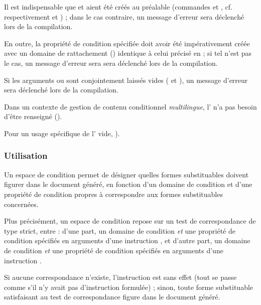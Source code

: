 \documentclass{article}
\begin{document}
Il est indispensable que  et  aient été créés au préalable (commandes  et , cf. respectivement  et ) ; dans le cas contraire, un message d'erreur sera déclenché lors de la compilation.

En outre, la propriété de condition spécifiée doit avoir été impérativement créée avec un domaine de rattachement () identique à celui précisé en  ; si tel n'est pas le cas, un message d'erreur sera sera déclenché lors de la compilation.

Si les arguments  ou  sont conjointement laissés vides (\argovoid{} et \argmvoid{}), un message d'erreur sera déclenché lors de la compilation.

Dans un contexte de gestion de contenu conditionnel \emph{multilingue}, l' n'a pas besoin d'être renseigné ().

Pour un usage spécifique de l' vide, ).

\subsubsection{Utilisation}\label{CtDoc_Commandes_SetCondiSpace_Utilisation}
Un espace de condition permet de désigner quelles formes substituables doivent figurer dans le document généré, en fonction d'un domaine de condition et d'une propriété de condition propres à correspondre aux formes substituables concernées.

Plus précisément, un espace de condition repose sur un test de correspondance de type  strict, entre : d'une part, un domaine de condition \emph{et} une propriété de condition spécifiés en arguments d'une instruction , et d'autre part, un domaine de condition \emph{et} une propriété de condition spécifiés en arguments d'une instruction .

Si aucune correspondance n'existe, l'instruction  est sans effet (tout se passe comme s'il n'y avait pas d'instruction formulée) ; sinon, toute forme substituable satisfaisant au test de correspondance figure dans le document généré.
\end{document}
